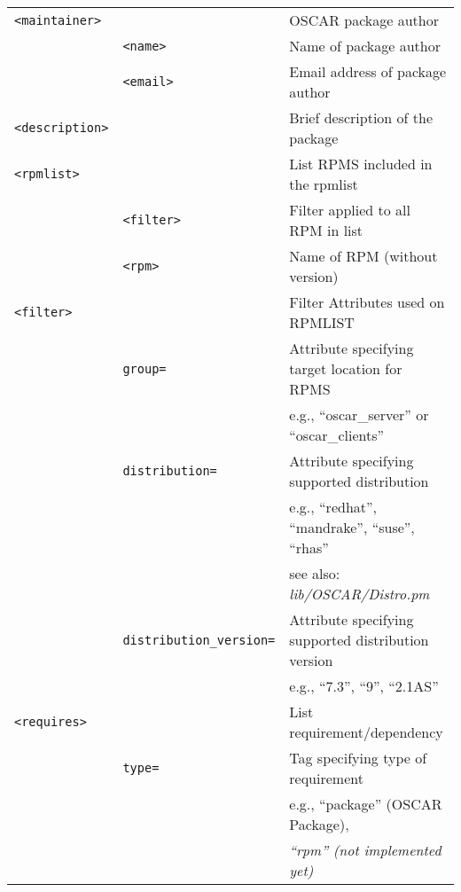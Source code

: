 \begin{table}[htbp]
\begin{center}
\begin{tabular}{|l|l|l|}
  \verb(<maintainer>(& & OSCAR package author                      \\\cline{2-3}
     & \verb(<name>(   & Name of package author                    \\\cline{2-3}
     & \verb(<email>(  & Email address of package author           \\\hline

  \verb(<description>(&& Brief description of the package              \\ \hline

  \verb(<rpmlist>(&    & List RPMS included in the rpmlist         \\\cline{2-3}
     & \verb(<filter>( & Filter applied to all RPM in list         \\\cline{2-3}
     & \verb(<rpm>(    & Name of RPM (without version)             \\\hline

  \verb(<filter>(&     & Filter Attributes used on RPMLIST            \\\cline{2-3}
     & \verb(group=(   & Attribute specifying target location for RPMS\\
     &                 & e.g., ``oscar\_server'' or ``oscar\_clients''\\\cline{2-3}
     & \verb(distribution=(& Attribute specifying supported distribution   \\
     &                 & e.g., ``redhat'', ``mandrake'', ``suse'', ``rhas''\\
     &                 & see also: \emph{lib/OSCAR/Distro.pm}              \\\cline{2-3}
     & \verb(distribution_version=(& Attribute specifying supported distribution version  \\
     &                 & e.g., ``7.3'', ``9'', ``2.1AS''                   \\\hline

  \verb(<requires>(&   & List requirement/dependency                \\\cline{2-3}
     & \verb(type=(    & Tag specifying type of requirement         \\
     &                 &  e.g., ``package'' (OSCAR Package),        \\
     &                 &  \emph{``rpm'' (not implemented yet)}      \\\hline


\end{tabular}
\end{center}
\end{table}
